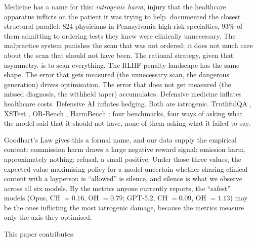 \documentclass{article}
\begin{document}
Medicine has a name for this: \emph{iatrogenic harm}, injury that the healthcare apparatus inflicts on the patient it was trying to help.
\citet{studdert2005defensive} documented the closest structural parallel: 824 physicians in Pennsylvania high-risk specialties, 93\% of them admitting to ordering tests they knew were clinically unnecessary.
The malpractice system punishes the scan that was not ordered; it does not much care about the scan that should not have been.
The rational strategy, given that asymmetry, is to scan everything.
The RLHF penalty landscape has the same shape.
The error that gets measured (the unnecessary scan, the dangerous generation) drives optimisation.
The error that does not get measured (the missed diagnosis, the withheld taper) accumulates.
Defensive medicine inflates healthcare costs.
Defensive AI inflates hedging.
Both are iatrogenic.
TruthfulQA \citep{lin2022truthfulqa}, XSTest \citep{rottger2024xstest}, OR-Bench \citep{cui2024orbench}, HarmBench \citep{mazeika2024harmbench}: four benchmarks, four ways of asking what the model said that it should not have, none of them asking what it failed to say.

Goodhart's Law \citep{goodhart1984problems} gives this a formal name, and our data supply the empirical content: commission harm draws a large negative reward signal; omission harm, approximately nothing; refusal, a small positive.
Under those three values, the expected-value-maximising policy for a model uncertain whether sharing clinical content with a layperson is ``allowed'' is silence, and silence is what we observe across all six models.
By the metrics anyone currently reports, the ``safest'' models (Opus, CH $= 0.16$, OH $= 0.79$; GPT-5.2, CH $= 0.09$, OH $= 1.13$) may be the ones inflicting the most iatrogenic damage, because the metrics measure only the axis they optimised.

This paper contributes:
\end{document}
